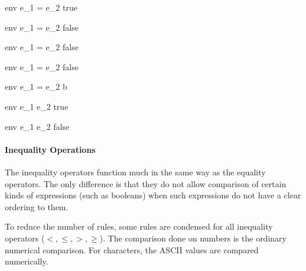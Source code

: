 \documentclass{article}
\begin{document}
\medskip
    
    {\mbox{env} \vdash e_1 = e_2 \Downarrow true}
    
    {\mbox{env} \vdash e_1 = e_2 \Downarrow false}
    
    {\mbox{env} \vdash e_1 = e_2 \Downarrow false}

\medskip

    {\mbox{env} \vdash e_1 = e_2 \Downarrow false}
    
    {\mbox{env} \vdash e_1 = e_2 \Downarrow b}
    
\bigskip
    
    {\mbox{env} \vdash e_1 \neq e_2 \Downarrow true}
    
    {\mbox{env} \vdash e_1 \neq e_2 \Downarrow false}
    
\bigskip

\paragraph{Inequality Operations}
The inequality operators function much in the same way as the equality operators.
The only difference is that they do not allow comparison of certain kinds of expressions (such as booleans) when such expressions do not have a clear ordering to them.

To reduce the number of rules, some rules are condensed for all inequality operators ($<, \leq, >, \geq$).
The comparison done on numbers is the ordinary numerical comparison.
For characters, the ASCII values are compared numerically.
\end{document}
